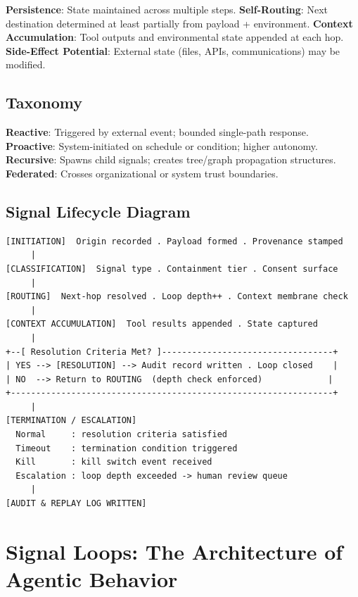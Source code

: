 \documentclass[11pt,a4paper]{article}
\begin{document}
\textbf{Persistence}: State maintained across multiple steps.
\textbf{Self-Routing}: Next destination determined at least partially from payload + environment.
\textbf{Context Accumulation}: Tool outputs and environmental state appended at each hop.
\textbf{Side-Effect Potential}: External state (files, APIs, communications) may be modified.

\subsection{Taxonomy}

\textbf{Reactive}: Triggered by external event; bounded single-path response.
\textbf{Proactive}: System-initiated on schedule or condition; higher autonomy.
\textbf{Recursive}: Spawns child signals; creates tree/graph propagation structures.
\textbf{Federated}: Crosses organizational or system trust boundaries.

\subsection{Signal Lifecycle Diagram}

\begin{lstlisting}[caption={Autonomous Signal Lifecycle in ButterClaw}]
[INITIATION]  Origin recorded . Payload formed . Provenance stamped
     |
[CLASSIFICATION]  Signal type . Containment tier . Consent surface
     |
[ROUTING]  Next-hop resolved . Loop depth++ . Context membrane check
     |
[CONTEXT ACCUMULATION]  Tool results appended . State captured
     |
+--[ Resolution Criteria Met? ]----------------------------------+
| YES --> [RESOLUTION] --> Audit record written . Loop closed    |
| NO  --> Return to ROUTING  (depth check enforced)             |
+----------------------------------------------------------------+
     |
[TERMINATION / ESCALATION]
  Normal     : resolution criteria satisfied
  Timeout    : termination condition triggered
  Kill       : kill switch event received
  Escalation : loop depth exceeded -> human review queue
     |
[AUDIT & REPLAY LOG WRITTEN]
\end{lstlisting}

\section{Signal Loops: The Architecture of Agentic Behavior}
\label{sec:signalloops}
\end{document}
